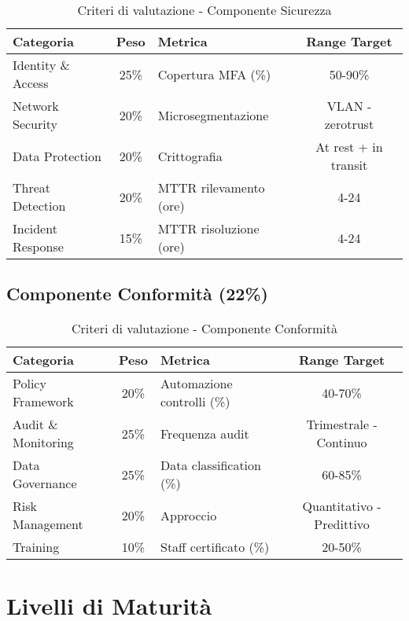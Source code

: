 \begin{table}[H]
\centering
\caption{Criteri di valutazione - Componente Sicurezza}
\small
\sffamily
\begin{tabular}{l c l c}
\toprule
\textbf{Categoria} & \textbf{Peso} & \textbf{Metrica} & \textbf{Range Target} \\
\midrule
Identity \& Access & 25\% & Copertura MFA (\%) & 50-90\% \\
Network Security & 20\% & Microsegmentazione & VLAN - \gls{zerotrust} \\
Data Protection & 20\% & Crittografia & At rest + in transit \\
Threat Detection & 20\% & MTTR rilevamento (ore) & 4-24 \\
Incident Response & 15\% & MTTR risoluzione (ore) & 4-24 \\
\bottomrule
\end{tabular}
\end{table}

\subsection{\texorpdfstring{Componente Conformità (22\%)}{B.3.4 - Componente Conformità (22\%)}}

\begin{table}[H]
\centering
\caption{Criteri di valutazione - Componente Conformità}
\small
\sffamily
\begin{tabular}{l c l c}
\toprule
\textbf{Categoria} & \textbf{Peso} & \textbf{Metrica} & \textbf{Range Target} \\
\midrule
Policy Framework & 20\% & Automazione controlli (\%) & 40-70\% \\
Audit \& Monitoring & 25\% & Frequenza audit & Trimestrale - Continuo \\
Data Governance & 25\% & Data classification (\%) & 60-85\% \\
Risk Management & 20\% & Approccio & Quantitativo - Predittivo \\
Training & 10\% & Staff certificato (\%) & 20-50\% \\
\bottomrule
\end{tabular}
\end{table}

\section{\texorpdfstring{Livelli di Maturità}{B.4 - Livelli di Maturità}}


